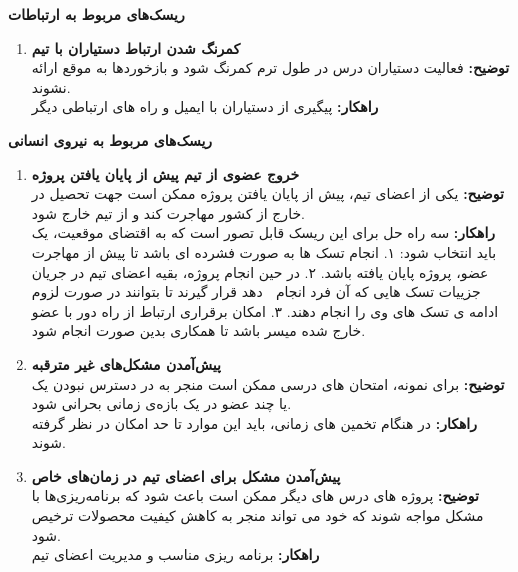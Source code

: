 \large \textbf{ریسک‌های مربوط به ارتباطات}
\begin{enumerate}[start = 15] 
    \item \textbf{کمرنگ شدن ارتباط دستیاران با تیم}
       \\\textbf{توضیح: }
        فعالیت دستیاران درس در طول ترم کمرنگ شود و بازخوردها به موقع ارائه نشوند.
       \\\textbf{راهکار: }
        پیگیری از دستیاران با ایمیل و راه های ارتباطی دیگر
\end{enumerate}

\large \textbf{ریسک‌های مربوط به نیروی انسانی}
\begin{enumerate}[start = 16] 
        \item \textbf{خروج عضوی از تیم پیش از پایان یافتن پروژه            }
       \\\textbf{توضیح: }
        یکی از اعضای تیم، پیش از پایان یافتن پروژه ممکن است جهت تحصیل در خارج از کشور مهاجرت کند و از تیم خارج شود.
       \\\textbf{راهکار: }
        سه راه حل برای این ریسک قابل تصور است که به اقتضای موقعیت، یک باید انتخاب شود: 
        ١. انجام تسک ها به صورت فشرده ای باشد تا پیش از مهاجرت عضو، پروژه پایان یافته باشد. 
        ٢. در حین انجام پروژه، بقیه اعضای تیم در جریان جزییات تسک هایی که آن فرد انجام مͬ دهد قرار گیرند تا بتوانند در صورت لزوم ادامه ی تسک های وی را انجام دهند.
         ٣. امکان برقراری ارتباط از راه دور با عضو خارج شده میسر باشد تا همکاری بدین صورت انجام شود.
        
    \item \textbf{پیش‌آمدن مشکل‌های غیر مترقبه}
       \\\textbf{توضیح: }
        برای نمونه، امتحان های درسی ممکن است منجر به در دسترس نبودن یک یا چند عضو در یک بازه‌ی زمانی بحرانی شود.
       \\\textbf{راهکار: }
        در هنگام تخمین های زمانی، باید این موارد تا حد امکان در نظر گرفته شوند.
    \item \textbf{پیش‌آمدن مشکل برای اعضای تیم در زمان‌های خاص}
       \\\textbf{توضیح: }
        پروژه های درس های دیگر ممکن است باعث شود که برنامه‌ریزی‌ها با مشکل مواجه شوند که خود می تواند منجر به کاهش کیفیت محصولات ترخیص شود.
       \\\textbf{راهکار: }
        برنامه ریزی مناسب و مدیریت اعضای تیم
\end{enumerate}

